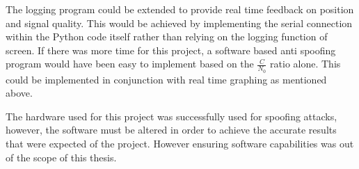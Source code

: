 The logging program could be extended to provide real time feedback on position and signal quality. This would be achieved by implementing the serial connection within
the Python code itself rather than relying on the logging function of screen.
If there was more time for this project, a software based anti spoofing program would have been easy to implement based
on the $\frac{C}{N_0}$ ratio alone. This could be implemented in conjunction with real time graphing as mentioned above.

The hardware used for this project was successfully used for spoofing attacks, however, the software must be altered in order to achieve the accurate results that were
expected of the project. However ensuring software capabilities was out of the scope of this thesis.